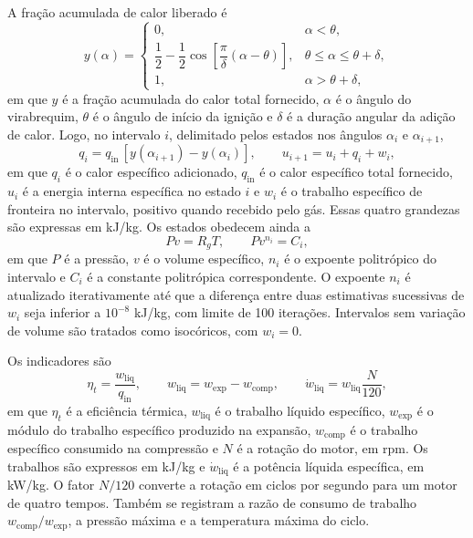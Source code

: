 \documentclass[a4paper,11pt]{article}
\begin{document}
A fração acumulada de calor liberado é
\begin{equation}
y(\alpha)=
\begin{cases}
0, & \alpha < \theta, \\[1mm]
\dfrac{1}{2}-\dfrac{1}{2}
\cos\!\left[\dfrac{\pi}{\delta}(\alpha-\theta)\right],
& \theta \leq \alpha \leq \theta+\delta, \\[2mm]
1, & \alpha > \theta+\delta,
\end{cases}
\label{eq:liberacao-calor}
\end{equation}
em que $y$ é a fração acumulada do calor total fornecido, $\alpha$ é o ângulo
do virabrequim, $\theta$ é o ângulo de início da ignição e $\delta$ é a duração
angular da adição de calor. Logo, no intervalo $i$, delimitado pelos estados
nos ângulos $\alpha_i$ e $\alpha_{i+1}$,
\begin{equation}
q_i=q_{\mathrm{in}}\,[y(\alpha_{i+1})-y(\alpha_i)],
\qquad
u_{i+1}=u_i+q_i+w_i,
\label{eq:primeira-lei}
\end{equation}
em que $q_i$ é o calor específico adicionado, $q_{\mathrm{in}}$ é o calor
específico total fornecido, $u_i$ é a energia interna específica no estado $i$
e $w_i$ é o trabalho específico de fronteira no intervalo, positivo quando
recebido pelo gás. Essas quatro grandezas são expressas em kJ/kg. Os estados
obedecem ainda a
\begin{equation}
Pv=R_gT,
\qquad
Pv^{n_i}=C_i,
\label{eq:estado-politropico}
\end{equation}
em que $P$ é a pressão, $v$ é o volume específico, $n_i$ é o expoente
politrópico do intervalo e $C_i$ é a constante politrópica correspondente. O
expoente $n_i$ é atualizado iterativamente até que a diferença entre duas
estimativas sucessivas de $w_i$ seja inferior a $10^{-8}$ kJ/kg, com limite de
100 iterações. Intervalos sem variação de volume são tratados como isocóricos,
com $w_i=0$.

Os indicadores são
\begin{equation}
\eta_t=\frac{w_{\mathrm{liq}}}{q_{\mathrm{in}}},
\qquad
w_{\mathrm{liq}}=w_{\mathrm{exp}}-w_{\mathrm{comp}},
\qquad
\dot w_{\mathrm{liq}}=w_{\mathrm{liq}}\frac{N}{120},
\label{eq:indicadores}
\end{equation}
em que $\eta_t$ é a eficiência térmica, $w_{\mathrm{liq}}$ é o trabalho líquido
específico, $w_{\mathrm{exp}}$ é o módulo do trabalho específico produzido na
expansão, $w_{\mathrm{comp}}$ é o trabalho específico consumido na compressão e
$N$ é a rotação do motor, em rpm. Os trabalhos são expressos em kJ/kg e
$\dot w_{\mathrm{liq}}$ é a potência líquida específica, em kW/kg. O fator
$N/120$ converte a rotação em ciclos por segundo para um motor de quatro tempos.
Também se registram a razão de consumo de trabalho
$w_{\mathrm{comp}}/w_{\mathrm{exp}}$, a pressão máxima e a temperatura máxima
do ciclo.
\end{document}
